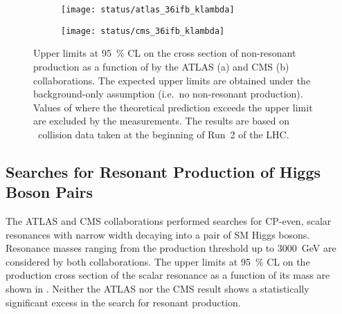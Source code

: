 \begin{figure}[htbp]
  \centering

  \begin{subfigure}[b]{0.9\textwidth}
    \centering

    \texttt{[image: status/atlas\_36ifb\_klambda]}


  \end{subfigure}

  \vspace{0.5em}

  \begin{subfigure}[b]{0.9\textwidth}
    \centering

    \texttt{[image: status/cms\_36ifb\_klambda]}

  \end{subfigure}

  \caption[Upper limits on the non-resonant \HH production cross section as a
  function of \klambda by the ATLAS and CMS collaborations at the beginning of
  Run~2 of the LHC.]{Upper limits at \SI{95}{\percent} CL on the cross section
    of non-resonant \HH production as a function of \klambda by the ATLAS (a)
    and CMS (b) collaborations. The expected upper limits are obtained under the
    background-only assumption (i.e.\ no non-resonant \HH production). Values of
    \klambda where the theoretical prediction exceeds the upper limit are
    excluded by the measurements. The results are based on \pp~collision data
    taken at the beginning of Run~2 of the LHC.}%
  \label{fig:prior_status_klambda}
\end{figure}


\subsection*{Searches for Resonant Production of Higgs Boson Pairs}%
\label{sec:past_results_resonant}

The ATLAS and CMS collaborations performed searches for CP-even, scalar
resonances with narrow width decaying into a pair of SM Higgs bosons. Resonance
masses ranging from the \HH production threshold up to \SI{3000}{\GeV} are
considered by both collaborations. The upper limits at \SI{95}{\percent} CL on
the production cross section of the scalar resonance as a function of its mass
are shown in . Neither the ATLAS nor the CMS result
shows a statistically significant excess in the search for resonant \HH
production.

